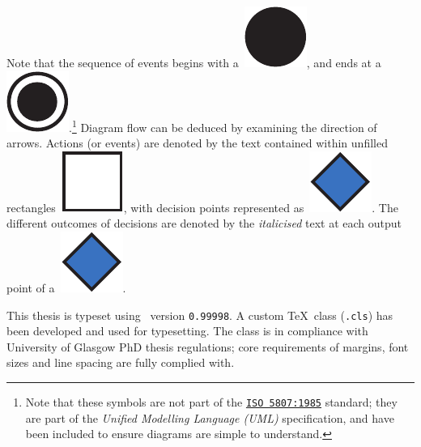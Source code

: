 \begin{preamble}
Note that the sequence of events begins with a~\includegraphics[height=\fontcharht\font`\d]{figures/ch0-example-start.pdf}, and ends at a~\includegraphics[height=\fontcharht\font`\d]{figures/ch0-example-end.pdf}.\footnote{Note that these symbols are not part of the \href{https://www.iso.org/standard/11955.html}{\texttt{ISO 5807:1985}} standard; they are part of the \emph{Unified Modelling Language (UML)} specification, and have been included to ensure diagrams are simple to understand.} Diagram flow can be deduced by examining the direction of arrows. Actions (or events) are denoted by the text contained within unfilled rectangles~\includegraphics[height=\fontcharht\font`\d]{figures/ch0-example-action.pdf}, with decision points represented as~\includegraphics[height=\fontcharht\font`\d]{figures/ch0-example-decision.pdf}. The different outcomes of decisions are denoted by the \emph{italicised} text at each output point of a~\includegraphics[height=\fontcharht\font`\d]{figures/ch0-example-decision.pdf}.

This thesis is typeset using \XeTeX\ version \texttt{0.99998}. A custom \TeX\ class (\texttt{.cls}) has been developed and used for typesetting. The class is in compliance with University of Glasgow PhD thesis regulations; core requirements of margins, font sizes and line spacing are fully complied with.

\end{preamble}

\newpage
\thispagestyle{empty}
\mbox{}
\newpage
\thispagestyle{empty}
\mbox{}
\newpage